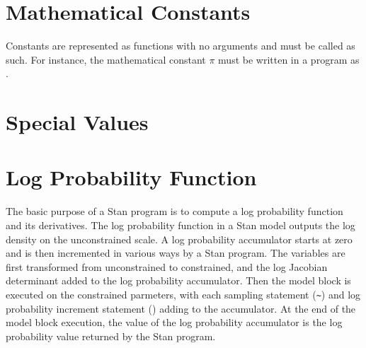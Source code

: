 \section{Mathematical Constants}\label{built-in-constants.section}

Constants are represented as functions with no arguments and must be
called as such.  For instance, the mathematical constant $\pi$ must be
written in a \Stan program as .

%
\begin{description}
%
%
%
%
%
%
\end{description}

\section{Special Values}

\begin{description}
%
%
%
%
\end{description}


\section{Log Probability Function}\label{get-lp.section}

The basic purpose of a Stan program is to compute a log probability
function and its derivatives.  The log probability function in a Stan
model outputs the log density on the unconstrained scale.  A log
probability accumulator starts at zero and is then incremented in
various ways by a Stan program.  The variables are first transformed
from unconstrained to constrained, and the log Jacobian determinant
added to the log probability accumulator.  Then the model block is
executed on the constrained parmeters, with each sampling statement
(\Verb|~|) and log probability increment statement
() adding to the accumulator.  At the end
of the model block execution, the value of the log probability
accumulator is the log probability value returned by the Stan program.


